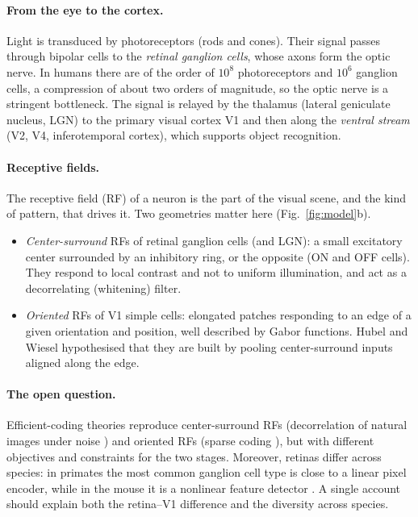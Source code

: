 \documentclass[11pt,a4paper]{article}
\begin{document}
\paragraph{From the eye to the cortex.} Light is transduced by photoreceptors (rods and cones). Their signal passes through bipolar cells to the \emph{retinal ganglion cells}, whose axons form the optic nerve. In humans there are of the order of $10^8$ photoreceptors and $10^6$ ganglion cells, a compression of about two orders of magnitude, so the optic nerve is a stringent bottleneck. The signal is relayed by the thalamus (lateral geniculate nucleus, LGN) to the primary visual cortex V1 and then along the \emph{ventral stream} (V2, V4, inferotemporal cortex), which supports object recognition.

\paragraph{Receptive fields.} The receptive field (RF) of a neuron is the part of the visual scene, and the kind of pattern, that drives it. Two geometries matter here (Fig.~\ref{fig:model}b).
\begin{itemize}
\item \emph{Center-surround} RFs of retinal ganglion cells (and LGN): a small excitatory center surrounded by an inhibitory ring, or the opposite (ON and OFF cells). They respond to local contrast and not to uniform illumination, and act as a decorrelating (whitening) filter.
\item \emph{Oriented} RFs of V1 simple cells: elongated patches responding to an edge of a given orientation and position, well described by Gabor functions. Hubel and Wiesel \cite{hubel1962} hypothesised that they are built by pooling center-surround inputs aligned along the edge.
\end{itemize}

\paragraph{The open question.} Efficient-coding theories reproduce center-surround RFs (decorrelation of natural images under noise \cite{atick1990}) and oriented RFs (sparse coding \cite{olshausen1996}), but with different objectives and constraints for the two stages. Moreover, retinas differ across species: in primates the most common ganglion cell type is close to a linear pixel encoder, while in the mouse it is a nonlinear feature detector \cite{roska2014}. A single account should explain both the retina--V1 difference and the diversity across species.
\end{document}
